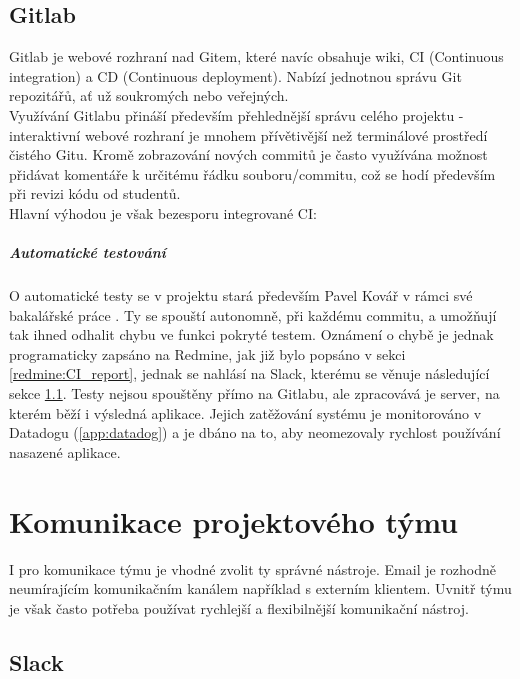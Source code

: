 \subsection{Gitlab} \label{version:gitlab}

Gitlab je webové rozhraní nad Gitem, které navíc obsahuje wiki, CI (Continuous integration) a CD (Continuous deployment). Nabízí jednotnou správu Git repozitářů, ať už soukromých nebo veřejných. \cite{gitlab}\\
Využívání Gitlabu přináší především přehlednější správu celého projektu - interaktivní webové rozhraní je mnohem přívětivější než terminálové prostředí čistého Gitu. Kromě zobrazování nových commitů je často využívána možnost přidávat komentáře k určitému řádku souboru/commitu, což se hodí především při revizi kódu od studentů.\\
Hlavní výhodou je však bezesporu integrované CI:
\subparagraph{Automatické testování} \label{version:gitlab:tests}
O automatické testy se v projektu stará především Pavel Kovář v rámci své bakalářské práce \cite{kovar}. Ty se spouští autonomně, při každému commitu, a umožňují tak ihned odhalit chybu ve funkci pokryté testem. Oznámení o chybě je jednak programaticky zapsáno na Redmine, jak již bylo popsáno v sekci \ref{redmine:CI_report}, jednak se nahlásí na Slack, kterému se věnuje následující sekce \ref{slack}. Testy nejsou spouštěny přímo na Gitlabu, ale zpracovává je server, na kterém běží i výsledná aplikace. Jejich zatěžování systému je monitorováno v Datadogu (\ref{app:datadog}) a je dbáno na to, aby neomezovaly rychlost používání nasazené aplikace.


\section{Komunikace projektového týmu}

I pro komunikace týmu je vhodné zvolit ty správné nástroje. Email je rozhodně neumírajícím komunikačním kanálem například s externím klientem. Uvnitř týmu je však často potřeba používat rychlejší a flexibilnější komunikační nástroj.

\subsection{Slack} \label{slack}


